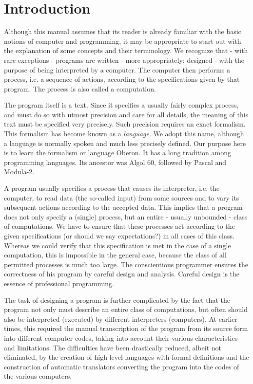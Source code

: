 \chapter{Introduction}

Although this manual assumes that its reader is already familiar with the basic notions of computer
and programming, it may be appropriate to start out with the explanation of some concepts and
their terminology. We recognize that - with rare exceptions - programs are written - more
appropriately: designed - with the purpose of being interpreted by a computer. The computer then
performs a process, i.e. a sequence of actions, according to the specifications given by that
program. The process is also called a computation.

The program itself is a text. Since it specifies a usually fairly complex process, and must do so with
utmost precision and care for all details, the meaning of this text must be specified very precisely.
Such precision requires an exact formalism. This formalism has become known as a \emph{language}. We
adopt this name, although a language is normally spoken and much less precisely defined. Our
purpose here is to learn the formalism or language Oberon. It has a long tradition among
programming languages. Its ancestor was Algol 60, followed by Pascal and Modula-2.

A program usually specifies a process that causes its interpreter, i.e. the computer, to read data
(the so-called input) from some sources and to vary its subsequent actions according to the
accepted data. This implies that a program does not only specify a (single) process, but an entire -
usually unbounded - class of computations. We have to ensure that these processes act according
to the given specifications (or should we say expectations?) in all cases of this class. Whereas we
could verify that this specification is met in the case of a single computation, this is impossible in the
general case, because the class of all permitted processes is much too large. The conscientious
programmer ensures the correctness of his program by careful design and analysis. Careful design
is the essence of professional programming.

The task of designing a program is further complicated by the fact that the program not only must
describe an entire class of computations, but often should also be interpreted (executed) by
different interpreters (computers). At earlier times, this required the manual transcription of the
program from its source form into different computer codes, taking into account their various
characteristics and limitations. The difficulties have been drastically reduced, albeit not eliminated,
by the creation of high level languages with formal definitions and the construction of automatic
translators converting the program into the codes of the various computers.

